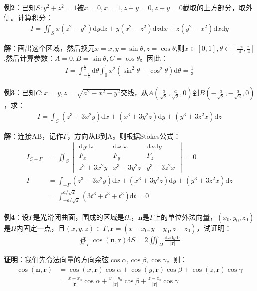 \documentclass{ctexart}
\let\oldtextbf\textbf
\renewcommand{\textbf}[1]{\textcolor{brown!50!red}{\oldtextbf{#1}}}
\begin{document}
\textbf{\color{brown!50!red}例2}：已知$S: y^2+z^2=1$被$x=0,x=1,z+y=0,z-y=0$截取的上方部分，取外侧。计算积分：
\begin{align*} 
 I=\iint_Sx(z^2-y^2)\mathrm{d}y\mathrm{d}z+y(x^2-z^2)\mathrm{d}z\mathrm{d}x+  
 z(y^2-x^2)\mathrm{d}x\mathrm{d}y
\end{align*}

\textbf{\color{brown!50!red}解}：画出这个区域，然后换元$x=x,y=\sin\theta,z=\cos\theta$,则$x\in[0,1],\theta\in[\frac{-\pi}{4},\frac{\pi}{4}]$,然后计算参数：$A=0,B=\sin\theta,C=\cos\theta$。因此：
\begin{align*} 
 I=\int_{-\frac{\pi}{4} }^ \frac{\pi}{4}\mathrm{d}\theta\int_0^1x^2(\sin^2\theta-\cos^2\theta)
\mathrm{d}\theta =\frac{1}{3}   
\end{align*}

\textbf{\color{brown!50!red}例3}：已知$C:x=y,z=\sqrt{a^2-x^2-y^2}$交线，从$A(\frac{a}{\sqrt{2}},\frac{a}{\sqrt{2}},0)$到$B(-\frac{a}{\sqrt{2}},-\frac{a}{\sqrt{2}},0)$，求：
\begin{align*} 
 I=\int_C (z^3+3x^2y)\mathrm{d}x+(x^3+3y^2z)\mathrm{d}y+(y^3+3z^2x)\mathrm{d}z   
\end{align*}

\textbf{\color{brown!50!red}解}：连接AB，记作$\Gamma$，方向从B到A。则根据Stokes公式：
\begin{align*} 
 I_{C+\Gamma}&=\iint_S\begin{vmatrix}
 \mathrm{d}y\mathrm{d}z   & \mathrm{d}z\mathrm{d}x & \mathrm{d}x\mathrm{d}y\\
F_x  & F_y & F_z\\
z^3+3x^2y  & x^3+3y^2z &y^3+3z^2x
\end{vmatrix}=0\\
I&=\int_{-\Gamma}(z^3+3x^2y)\mathrm{d}x+(x^3+3y^2z)\mathrm{d}y+(y^3+3z^2x)\mathrm{d}z  \\
&=\int_{-a/\sqrt{2} }^{a/\sqrt{2} }(3t^3+t^3+t^3)\mathrm{d}t=0
\end{align*}

\textbf{\color{brown!50!red}例4}：设$\Gamma$是光滑闭曲面，围成的区域是$\Omega$,，$\bm{n}$是$\Gamma$上的单位外法向量，$(x_0,y_0,z_0)$是$\Omega$内固定一点，且$(x,y,z)\in\Gamma,\bm{r}=(x-x_0,y-y_0,z-z_0)$，试证明：
\begin{align*} 
\oiint_\Gamma\cos(\bm{n},\bm{r})\mathrm{d}S=2\iiint_\Omega\frac{\mathrm{d}x\mathrm{d}y\mathrm{d}z}
{|\bm{r}|}  
\end{align*}

\textbf{\color{brown!50!red}证明}：我们先令法向量的方向余弦$\cos \alpha,\cos\beta,\cos\gamma$，则：
\begin{align*} 
\cos(\bm{n},\bm{r})&=\cos(x,\bm{r})\cos\alpha+\cos(y,\bm{r})\cos\beta+\cos(z,\bm{r})\cos\gamma
\\&=\frac{x-x_0}{|\bm{r}|}\cos\alpha+\frac{y-y_0}{|\bm{r}|}\cos\beta+
\frac{z-z_0}{|\bm{r}|}\cos\gamma
\end{align*}
\end{document}
